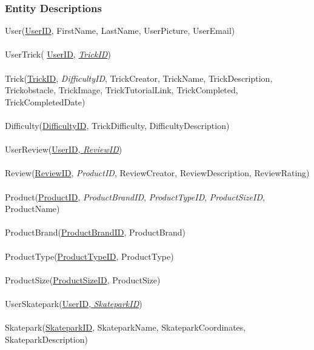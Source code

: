 \subsubsection{Entity Descriptions}

User(\underline{UserID}, FirstName, LastName, UserPicture, UserEmail) \\ \\

UserTrick( \underline{UserID}, \underline{ \emph{TrickID}}) \\ \\

Trick(\underline{TrickID}, \emph{DifficultyID}, TrickCreator, TrickName, TrickDescription, Trickobstacle,  TrickImage, TrickTutorialLink, TrickCompleted, TrickCompletedDate)  \\ \\ 

Difficulty(\underline{DifficultyID}, TrickDifficulty, DifficultyDescription) \\ \\ 

UserReview(\underline{UserID},\underline{  \emph{ReviewID}}) \\ \\

Review(\underline{ReviewID}, \emph{ProductID}, ReviewCreator, ReviewDescription, ReviewRating) \\ \\ 

Product(\underline{ProductID}, \emph{ProductBrandID}, \emph{ProductTypeID}, \emph{ProductSizeID}, ProductName) \\ \\

ProductBrand(\underline{ProductBrandID}, ProductBrand) \\ \\ 

ProductType(\underline{ProductTypeID}, ProductType) \\ \\ 

ProductSize(\underline{ProductSizeID}, ProductSize)  \\ \\ 

UserSkatepark(\underline{UserID},\underline{  \emph{SkateparkID}}) \\ \\ 

Skatepark(\underline{SkateparkID}, SkateparkName, SkateparkCoordinates, SkateparkDescription) \\ \\


